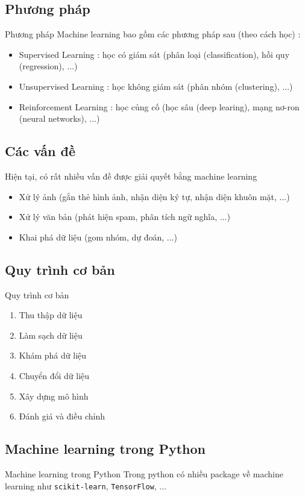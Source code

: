 \documentclass[11pt]{beamer}
\begin{document}
\subsection{Phương pháp}
\begin{frame}{Phương pháp}
Machine learning bao gồm các phương pháp sau (theo cách học) :
\begin{itemize}
\item Supervised Learning : học có giám sát (phân loại (classification), hồi quy (regression), ...)
\item Unsupervised Learning : học không giám sát (phân nhóm (clustering), ...)
\item Reinforcement Learning : học củng cố (học sâu (deep learing), mạng nơ-ron (neural networks), ...)
\end{itemize}
\end{frame}
\subsection{Các vấn đề}
\begin{frame}
Hiện tại, có rất nhiều vấn đề được giải quyết bằng machine learning
\begin{itemize}
\item Xử lý ảnh (gắn thẻ hình ảnh, nhận diện ký tự, nhận diện khuôn mặt, ...)
\item Xử lý văn bản (phát hiện spam, phân tích ngữ nghĩa, ...)
\item Khai phá dữ liệu (gom nhóm, dự đoán, ...)
\end{itemize}
\end{frame}
\subsection{Quy trình cơ bản}
\begin{frame}{Quy trình cơ bản}
  \begin{enumerate}
    \item Thu thập dữ liệu
    \item Làm sạch dữ liệu
    \item Khám phá dữ liệu
    \item Chuyển đổi dữ liệu
    \item Xây dựng mô hình
    \item Đánh giá và điều chỉnh
  \end{enumerate}

\end{frame}
\subsection{Machine learning trong Python}
\begin{frame}{Machine learning trong Python}
Trong python có nhiều package về machine learning như \texttt{scikit-learn}, \texttt{TensorFlow}, ...
\end{frame}
\end{document}
